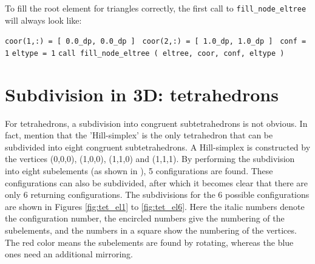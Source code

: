 To fill the root element for triangles correctly, the first call to \texttt{fill\_node\_eltree} will always look 
like: \newline

\noindent
\texttt{coor(1,:) = [ 0.0\_dp, 0.0\_dp ] } \newline
\texttt{coor(2,:) = [ 1.0\_dp, 1.0\_dp ] } \newline
\texttt{conf = 1}\newline
\texttt{eltype = 1}\newline
\texttt{call fill\_node\_eltree ( eltree, coor, conf, eltype )}\newline





\section{Subdivision in 3D: tetrahedrons}
For tetrahedrons, a subdivision into congruent subtetrahedrons is not obvious. In fact, \cite{matousek2011} mention 
that the 'Hill-simplex' is the only tetrahedron that can be subdivided into eight congruent subtetrahedrons. A Hill-simplex
is constructed by the vertices (0,0,0), (1,0,0), (1,1,0) and (1,1,1). By performing the subdivision into eight subelements 
(as shown in \cite{matousek2011}), 5 configurations are found. These configurations can also be subdivided, after which
it becomes clear that there are only 6 returning configurations. The subdivisions for the 6 possible configurations are 
shown in Figures \ref{fig:tet_el1} to \ref{fig:tet_el6}. Here the italic numbers denote the configuration number, the 
encircled numbers give the numbering of the subelements, and the numbers in a square show the numbering of the 
vertices. The red color means the subelements are found by rotating, whereas the blue ones need an additional mirroring.

\renewcommand{\arraystretch}{1.5}

